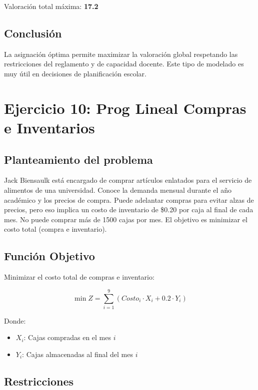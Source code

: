 \documentclass[12pt, a4paper, oneside]{book}
\theoremstyle{definition}
\begin{document}
    Valoración total máxima: \textbf{17.2}

    \subsection{Conclusión}

    La asignación óptima permite maximizar la valoración global respetando las restricciones del reglamento y de capacidad docente. Este tipo de modelado es muy útil en decisiones de planificación escolar.




    \newpage
    \section{Ejercicio 10: Prog Lineal Compras e Inventarios}

    \subsection{Planteamiento del problema}
    Jack Biensaulk está encargado de comprar artículos enlatados para el servicio de alimentos de una universidad. Conoce la demanda mensual durante el año académico y los precios de compra. Puede adelantar compras para evitar alzas de precios, pero eso implica un costo de inventario de \$0.20 por caja al final de cada mes. No puede comprar más de 1500 cajas por mes. El objetivo es minimizar el costo total (compra e inventario).

    \subsection{Función Objetivo}
    Minimizar el costo total de compras e inventario:

    \[
    \min Z = \sum_{i=1}^{9} (Costo_i \cdot X_i + 0.2 \cdot Y_i)
    \]

    Donde:
    \begin{itemize}
    \item \(X_i\): Cajas compradas en el mes \(i\)
    \item \(Y_i\): Cajas almacenadas al final del mes \(i\)
    \end{itemize}

    \subsection{Restricciones}
\end{document}
